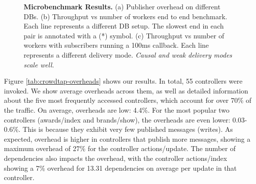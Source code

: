    \begin{figure}[t]
    \centering {} \hspace{0.1cm}  \hspace{0.1cm} 
    \vspace{-0.4cm}
    \caption{\small {\bf Microbenchmark Results.}
     (a) Publisher overhead on different DBs.
     (b) Throughput vs number of workers end to end benchmark.
         Each line represents a different DB setup.
         The slowest end in each pair is annotated with a (*) symbol.
     (c) Throughput vs number of workers with subscribers running a 100ms callback.
         Each line represents a different delivery mode.
         {\em Causal and weak delivery modes scale well.}
     \vspace{-15pt} }
   \end{figure}

Figure \ref{tab:crowdtap-overheads} shows our results. In total, 55 controllers
were invoked. We show average overheads across them, as well as detailed
information about the five most frequently accessed controllers, which account
for over 70\% of the traffic. On average, \synapse overheads are low: 4.4\%.
For the most popular two controllers ({\code awards/index} and {\code
brands/show}), the overheads are even lower: 0.03-0.6\%. This is because they
exhibit very few published messages (writes). As expected, \synapse overhead
is higher in controllers that publish more messages, showing a maximum overhead
of 27\% for the controller {\code actions/update}. The number of dependencies also
impacts the overhead, with the controller {\code actions/index} showing a 7\%
overhead for 13.31 dependencies on average per update in that controller.

